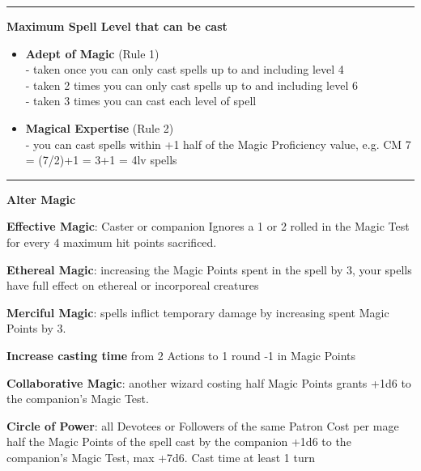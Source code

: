 \documentclass[a4paper,12 pt,openany]{book}
\newcommand{\linex}{\rule{\textwidth}{0.4pt}}
\begin{document}
\begin{textblock*}{13.5cm}
\linex

\textbf{Maximum Spell Level that can be cast}

\begin{itemize}
\item
\textbf{Adept of Magic} (Rule 1) \\
- taken once you can only cast spells up to and including level 4\\
- taken 2 times you can only cast spells up to and including level 6\\
- taken 3 times you can cast each level of spell

\item
\textbf{Magical Expertise} (Rule 2)\\
- you can cast spells within +1 half of the Magic Proficiency value, e.g. CM 7 = (7/2)+1 = 3+1 = 4lv spells

\end{itemize}

\linex

\textbf{Alter Magic}

\textbf{Effective Magic}: Caster or companion Ignores a 1 or 2 rolled in the Magic Test for every 4 maximum hit points sacrificed.

\textbf{Ethereal Magic}: increasing the Magic Points spent in the spell by 3, your spells have full effect on ethereal or incorporeal creatures

\textbf{Merciful Magic}: spells inflict temporary damage by increasing spent Magic Points by 3.

\textbf{Increase casting time} from 2 Actions to 1 round -1 in Magic Points

\textbf{Collaborative Magic}: another wizard costing half Magic Points grants +1d6 to the companion's Magic Test.

\textbf{Circle of Power}: all Devotees or Followers of the same Patron
Cost per mage half the Magic Points of the spell cast by the companion +1d6 to the companion's Magic Test, max +7d6. Cast time at least 1 turn
\end{textblock*}

~\newpage
\end{document}
